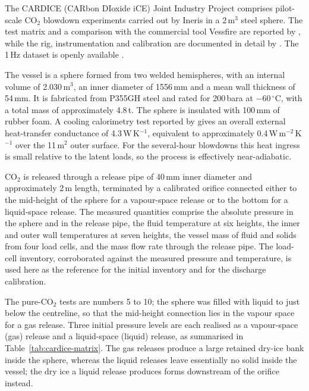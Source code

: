 \documentclass[5p,authoryear]{elsarticle}
\begin{document}
The CARDICE (CARbon DIoxide iCE) Joint Industry Project comprises pilot-scale CO$_2$ blowdown
experiments carried out by Ineris in a 2\,m$^3$ steel sphere. The test matrix and a comparison
with the commercial tool Vessfire are reported by \citet{Vaillant2021}, while the rig,
instrumentation and calibration are documented in detail by \citet{Jamois2023}. The 1\,Hz
dataset is openly available \citep{CardiceData2025}.

The vessel is a sphere formed from two welded hemispheres, with an internal volume of
2.030\,m$^3$, an inner diameter of 1556\,mm and a mean wall thickness of 54\,mm. It is
fabricated from P355GH steel and rated for 200\,bara at $-60\,^\circ$C, with a total mass of
approximately 4.8\,t. The sphere is insulated with 100\,mm of rubber foam. A cooling
calorimetry test reported by \citet{Jamois2023} gives an overall external heat-transfer
conductance of 4.3\,W\,K$^{-1}$, equivalent to approximately 0.4\,W\,m$^{-2}$\,K$^{-1}$ over the
11\,m$^2$ outer surface. For the several-hour blowdowns this heat ingress is small relative to
the latent loads, so the process is effectively near-adiabatic.

CO$_2$ is released through a release pipe of 40\,mm inner diameter and approximately 2\,m
length, terminated by a calibrated orifice connected either to the mid-height of the sphere for a
vapour-space release or to the bottom for a liquid-space release. The measured quantities
comprise the absolute pressure in the sphere and in the release pipe, the fluid temperature at
six heights, the inner and outer wall temperatures at seven heights, the vessel mass of fluid
and solids from four load cells, and the mass flow rate through the release pipe. The load-cell
inventory, corroborated against the measured pressure and temperature, is used here as the
reference for the initial inventory and for the discharge calibration.

The pure-CO$_2$ tests are numbers 5 to 10; the sphere was filled with liquid to just below the
centreline, so that the mid-height connection lies in the vapour space for a gas release. Three initial pressure levels are each realised as a vapour-space (gas) release and
a liquid-space (liquid) release, as summarised in Table~\ref{tab:cardice-matrix}. The gas
releases produce a large retained dry-ice bank inside the sphere, whereas the liquid releases
leave essentially no solid inside the vessel; the dry ice a liquid release produces forms
downstream of the orifice instead.
\end{document}
